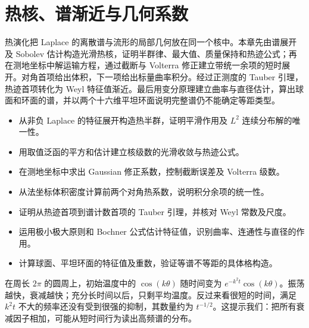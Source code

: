 
% 
% 

\chapter{热核、谱渐近与几何系数}
\label{g3:ch:16}

\begin{chapterabstract}
	热演化把 Laplace 的离散谱与流形的局部几何放在同一个核中。本章先由谱展开及 Sobolev 估计构造光滑热核，证明半群律、最大值、质量保持和热迹公式；再在测地坐标中解运输方程，通过截断与 Volterra 修正建立带统一余项的短时展开。对角首项给出体积，下一项给出标量曲率积分。经过正测度的 Tauber 引理，热迹首项转化为 Weyl 特征值渐近。最后用变分原理建立曲率与直径估计，算出球面和环面的谱，并以两个十六维平坦环面说明完整谱仍不能确定等距类型。
\end{chapterabstract}

\begin{learninggoals}
	\begin{itemize}
		\item 从非负 Laplace 的特征展开构造热半群，证明平滑作用及 \(L^2\) 连续分布解的唯一性。
		\item 用取值泛函的平方和估计建立核级数的光滑收敛与热迹公式。
		\item 在测地坐标中求出 Gaussian 修正系数，控制截断误差及 Volterra 级数。
		\item 从法坐标体积密度计算前两个对角热系数，说明积分余项的统一性。
		\item 证明从热迹首项到谱计数首项的 Tauber 引理，并核对 Weyl 常数及尺度。
		\item 运用极小极大原则和 Bochner 公式估计特征值，识别曲率、连通性与直径的作用。
		\item 计算球面、平坦环面的特征值及重数，验证等谱不等距的具体格构造。
	\end{itemize}
\end{learninggoals}

在周长 \(2\pi\) 的圆周上，初始温度中的 \(\cos(k\theta)\) 随时间变为 \(e^{-k^2t}\cos(k\theta)\)。振荡越快，衰减越快；充分长时间以后，只剩平均温度。反过来看很短的时间，满足 \(k^2t\) 不大的频率还没有受到很强的抑制，其数量约为 \(t^{-1/2}\)。这提示我们：把所有衰减因子相加，可能从短时间行为读出高频谱的分布。

